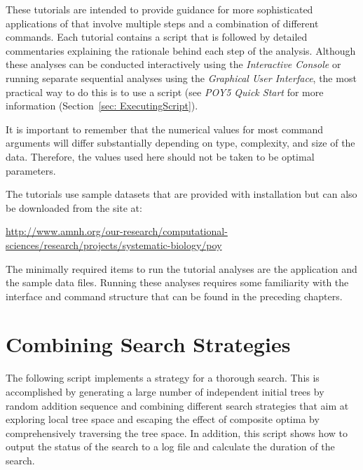 These tutorials are intended to provide guidance for more sophisticated
applications of \poy that involve multiple steps and a combination
of different commands. Each tutorial contains a \poy script that
is followed by detailed commentaries explaining the rationale behind
each step of the analysis. Although these analyses can be conducted
interactively using the \emph{Interactive Console} or running
separate sequential analyses using the \emph{Graphical User Interface}, 
the most practical way  to do this is to use a \poy script 
(see \emph{POY5 Quick Start} for more information 
(Section~\ref{sec: ExecutingScript}).\\

\begin{statement}
It is important to remember that the numerical values for most
command arguments will differ substantially depending on type,
complexity, and size of the data. Therefore, the values used here
should not be taken to be optimal parameters.  \end{statement}

\indent The tutorials use sample datasets that are provided with
\poy installation but can also be downloaded from the \poy site at:
\begin{center}
\url{http://www.amnh.org/our-research/computational-sciences/research/projects/systematic-biology/poy}
\end{center} The minimally required items to run the tutorial
analyses are the \poy application and the sample data files.  Running
these analyses requires some familiarity with the \poy interface
and command structure that can be found in the preceding chapters.


\section{Combining Search Strategies}{\label{tutorial1}}

The following script implements a strategy for a thorough search.
This is accomplished by generating a large number of independent
initial trees by random addition sequence and combining different
search strategies that aim at exploring local tree space and escaping
the effect of composite optima by comprehensively traversing the
tree space. In addition, this script shows how to output the status
of the search to a log file and
 calculate the duration of the search.


